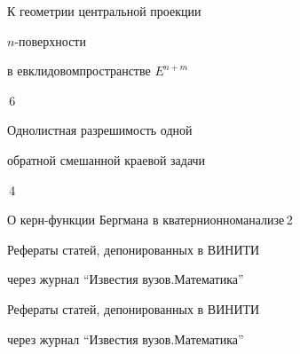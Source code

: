 





{К геометрии центральной проекции


$n$-поверхности


в евклидовом\newline пространстве $E^{n+m}$}{\No\,6}




{Однолистная разрешимость одной \newline


обратной смешанной краевой задачи}{\No\,4}




{О керн-функции Бергмана в кватернионном\newline анализе}{\No\,2}


\bigskip





\noindent{}Рефераты статей, депонированных в ВИНИТИ


через журнал ``Известия вузов.\newline Математика''





\noindent{}Рефераты статей, депонированных в ВИНИТИ


через журнал ``Известия вузов.\newline Математика''














